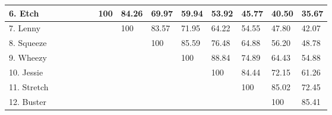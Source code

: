 \documentclass[a4paper, 12pt]{book}
\begin{document}
\begin{table}[htbp]
{\begin{tabular}{|l|l|l|l|l|l|l|l|l|l|l|l|l|l|}
				6. Etch      & \cellcolor[HTML]{000000} & \cellcolor[HTML]{000000} & \cellcolor[HTML]{000000} & \cellcolor[HTML]{000000} & \cellcolor[HTML]{000000} & 100                      & 84.26                    & 69.97                    & 59.94                    & 53.92                    & 45.77                    & 40.50                    & 35.67        \\ \hline
				7. Lenny     & \cellcolor[HTML]{000000} & \cellcolor[HTML]{000000} & \cellcolor[HTML]{000000} & \cellcolor[HTML]{000000} & \cellcolor[HTML]{000000} & \cellcolor[HTML]{000000} & 100                      & 83.57                    & 71.95                    & 64.22                    & 54.55                    & 47.80                    & 42.07        \\ \hline
				8. Squeeze   & \cellcolor[HTML]{000000} & \cellcolor[HTML]{000000} & \cellcolor[HTML]{000000} & \cellcolor[HTML]{000000} & \cellcolor[HTML]{000000} & \cellcolor[HTML]{000000} & \cellcolor[HTML]{000000} & 100                      & 85.59                    & 76.48                    & 64.88                    & 56.20                    & 48.78        \\ \hline
				9. Wheezy    & \cellcolor[HTML]{000000} & \cellcolor[HTML]{000000} & \cellcolor[HTML]{000000} & \cellcolor[HTML]{000000} & \cellcolor[HTML]{000000} & \cellcolor[HTML]{000000} & \cellcolor[HTML]{000000} & \cellcolor[HTML]{000000} & 100                      & 88.84                    & 74.89                    & 64.43                    & 54.88        \\ \hline
				10. Jessie   & \cellcolor[HTML]{000000} & \cellcolor[HTML]{000000} & \cellcolor[HTML]{000000} & \cellcolor[HTML]{000000} & \cellcolor[HTML]{000000} & \cellcolor[HTML]{000000} & \cellcolor[HTML]{000000} & \cellcolor[HTML]{000000} & \cellcolor[HTML]{000000} & 100                      & 84.44                    & 72.15                    & 61.26        \\ \hline
				11. Stretch  & \cellcolor[HTML]{000000} & \cellcolor[HTML]{000000} & \cellcolor[HTML]{000000} & \cellcolor[HTML]{000000} & \cellcolor[HTML]{000000} & \cellcolor[HTML]{000000} & \cellcolor[HTML]{000000} & \cellcolor[HTML]{000000} & \cellcolor[HTML]{000000} & \cellcolor[HTML]{000000} & 100                      & 85.02                    & 72.45        \\ \hline
				12. Buster   & \cellcolor[HTML]{000000} & \cellcolor[HTML]{000000} & \cellcolor[HTML]{000000} & \cellcolor[HTML]{000000} & \cellcolor[HTML]{000000} & \cellcolor[HTML]{000000} & \cellcolor[HTML]{000000} & \cellcolor[HTML]{000000} & \cellcolor[HTML]{000000} & \cellcolor[HTML]{000000} & \cellcolor[HTML]{000000} & 100                      & 85.41        \\ \hline

\end{tabular}}
\end{table}
\end{document}
